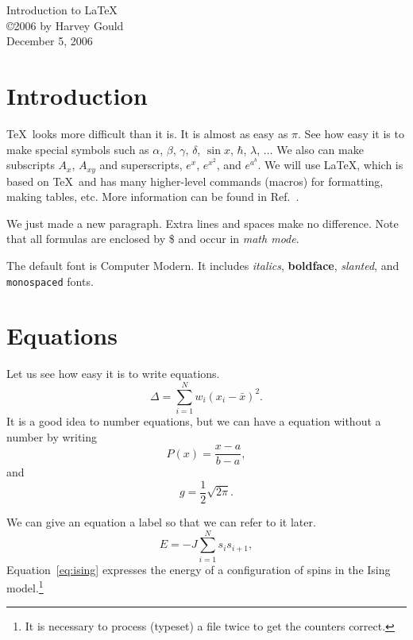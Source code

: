 \documentclass[12pt]{article}
\begin{document}
\begin{center}
{\large Introduction to \LaTeX} \\ %
\copyright 2006 by Harvey Gould \\
December 5, 2006
\end{center}

\section{Introduction}
\TeX\ looks more difficult than it is. It is
almost as easy as $\pi$. See how easy it is to make special
symbols such as $\alpha$,
$\beta$, $\gamma$,
$\delta$, $\sin x$, $\hbar$, $\lambda$, $\ldots$ We also can make
subscripts
$A_{x}$, $A_{xy}$ and superscripts, $e^x$, $e^{x^2}$, and
$e^{a^b}$. We will use \LaTeX, which is based on \TeX\ and has
many higher-level commands (macros) for formatting, making
tables, etc. More information can be found in Ref.~\cite{latex}.

We just made a new paragraph. Extra lines and spaces make no
difference. Note that all formulas are enclosed by
\$ and occur in \textit{math mode}.

The default font is Computer Modern. It includes \textit{italics},
\textbf{boldface},
\textsl{slanted}, and \texttt{monospaced} fonts.

\section{Equations}
Let us see how easy it is to write equations.
\begin{equation}
\Delta =\sum_{i=1}^N w_i (x_i - \bar{x})^2 .
\end{equation}
It is a good idea to number equations, but we can have a
equation without a number by writing
\begin{equation}
P(x) = \frac{x - a}{b - a} , \nonumber
\end{equation}
and
\begin{equation}
g = \frac{1}{2} \sqrt{2\pi} . \nonumber
\end{equation}

We can give an equation a label so that we can refer to it later.
\begin{equation}
\label{eq:ising}
E = -J \sum_{i=1}^N s_i s_{i+1} ,
\end{equation}
Equation~\eqref{eq:ising} expresses the energy of a configuration
of spins in the Ising model.\footnote{It is necessary to process (typeset) a
file twice to get the counters correct.}
\end{document}
